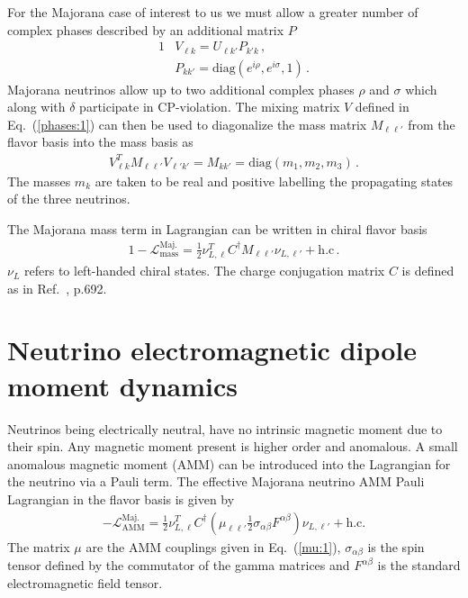\documentclass[addchapnum]{ws-rv961x669} %
\newcommand{\req}[1]{Eq.~(\ref{#1})}
\begin{document}
For the Majorana case of interest to us we must allow a greater number of complex phases described by an additional matrix $P$
\begin{alignat}{1}
	\label{phases:1} &V_{\ell k} = U_{\ell k'}P_{k'k}\,,\\
	\label{phases:3} &P_{kk'} = \mathrm{diag}(e^{i\rho},e^{i\sigma},1)\,.
\end{alignat}
Majorana neutrinos allow up to two additional complex phases $\rho$ and $\sigma$ which along with $\delta$ participate in CP-violation. The mixing matrix $V$ defined in \req{phases:1} can then be used to diagonalize the mass matrix $M_{\ell\ell'}$ from the flavor basis into the mass basis as
\begin{align}
    \label{diag:1}
    V_{\ell k}^{T}M_{\ell\ell'}V_{\ell'k'} = M_{kk'} = \mathrm{diag}(m_{1},m_{2},m_{3})\,.
\end{align}
The masses $m_{k}$ are taken to be real and positive labelling the propagating states of the three neutrinos.

The Majorana mass term in Lagrangian can be written in chiral flavor basis 
\begin{alignat}{1}
	\label{mass:1} -\mathcal{L}_{\mathrm{mass}}^{\mathrm{Maj.}}=\frac{1}{2}\nu_{L,\ell}^{T}C^{\dag}M_{\ell\ell'}\nu_{L,\ell'}+\mathrm{h.c}\,.
\end{alignat}
$\nu_{L}$ refers to left-handed chiral states. The charge conjugation matrix $C$ is defined as in Ref.~\cite{Itzykson:1980rh}, p.692.

\section{Neutrino electromagnetic dipole moment dynamics}
\label{sec:numoment}

Neutrinos being electrically neutral,  have no intrinsic magnetic moment due to their spin. Any magnetic moment present is higher order and anomalous. A small anomalous magnetic moment (AMM) can be introduced into the Lagrangian for the neutrino via a Pauli term. The effective Majorana neutrino AMM Pauli Lagrangian in the flavor basis is given by
\begin{align}
	\label{moment:1} -\mathcal{L}_{\mathrm{AMM}}^\mathrm{Maj.}=\frac{1}{2}\nu_{L,\ell}^{T}C^{\dag}\left(\mu_{\ell\ell'}\frac{1}{2}\sigma_{\alpha\beta}F^{\alpha\beta}\right)\nu_{L,\ell'}+\mathrm{h.c.}
\end{align}
The matrix $\mu$ are the AMM couplings given in \req{mu:1}, $\sigma_{\alpha\beta}$ is the spin tensor defined by the commutator of the gamma matrices and $F^{\alpha\beta}$ is the standard electromagnetic field tensor.
\end{document}
